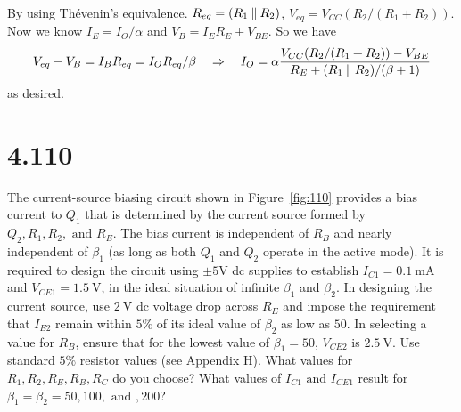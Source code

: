 \documentclass[12pt, a4paper]{article}
\begin{document}
\Ans \\
By using Thévenin's equivalence. $R_{eq} = (R_1 \mathbin{\|} R_2)$,
$V_{eq} = V_{CC}(R_2/(R_1+R_2))$. \\
Now we know $I_E = I_O / \alpha$ and $V_B = I_ER_E + V_{BE}$. So we have
\[
  V_{eq} - V_B = I_BR_{eq} = I_OR_{eq}/\beta \quad \Rightarrow \quad
  I_O = \alpha \frac{V_{CC} (R_2 / (R_1 + R_2)) - V_{BE}}{R_E + (R_1 \mathbin{\|} R_2) / (\beta + 1)} 
\]
as desired.

\section{4.110}
The current-source biasing circuit shown in Figure~\ref{fig:110} provides a bias current to $Q_1$ that is determined by the current source formed by $Q_2, R_1, R_2, \text{ and } R_E$. The bias current is independent of $R_B$ and nearly independent of $\beta_1$ (as long as both $Q_1$ and $Q_2$ operate in the active mode).
It is required to design the circuit using $\pm 5 \si{\V}$ dc supplies to establish $I_{C1} = \SI{0.1}{\mA}$ and $V_{CE1} = \SI{1.5}{\V}$, in the ideal situation of infinite $\beta_1$ and $\beta_2$. In designing the current source, use $\SI{2}{\V}$ dc voltage drop across $R_E$ and impose the requirement that $I_{E2}$ remain within $5\%$ of its ideal value of $\beta_2$ as low as $50$. 
In selecting a value for $R_B$, ensure that for the lowest value of $\beta_1 = 50$, $V_{CE2}$ is $\SI{2.5}{\V}$. Use standard $5 \%$ resistor values (see Appendix H). What values for $R_1, R_2, R_E, R_B, R_C$ do you choose? What values of $I_{C1} \text{ and } I_{CE1}$ result for $\beta_1 = \beta_2 = 50, 100, \text{ and } , 200$?
\end{document}
